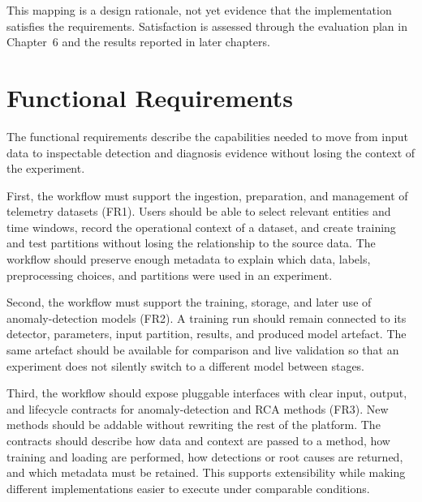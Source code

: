 This mapping is a design rationale, not yet evidence that the implementation satisfies the requirements. Satisfaction is assessed through the evaluation plan in Chapter~6 and the results reported in later chapters.

\section{Functional Requirements}
The functional requirements describe the capabilities needed to move from input data to inspectable detection and diagnosis evidence without losing the context of the experiment.


First, the workflow must support the ingestion, preparation, and management of telemetry datasets (FR1). Users should be able to select relevant entities and time windows, record the operational context of a dataset, and create training and test partitions without losing the relationship to the source data. The workflow should preserve enough metadata to explain which data, labels, preprocessing choices, and partitions were used in an experiment.

Second, the workflow must support the training, storage, and later use of anomaly-detection models (FR2). A training run should remain connected to its detector, parameters, input partition, results, and produced model artefact. The same artefact should be available for comparison and live validation so that an experiment does not silently switch to a different model between stages.

Third, the workflow should expose pluggable interfaces with clear input, output, and lifecycle contracts for anomaly-detection and RCA methods (FR3). New methods should be addable without rewriting the rest of the platform. The contracts should describe how data and context are passed to a method, how training and loading are performed, how detections or root causes are returned, and which metadata must be retained. This supports extensibility while making different implementations easier to execute under comparable conditions.

